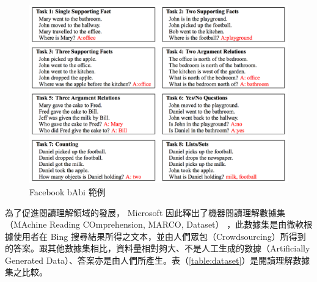 \begin{figure}[h]
    \includegraphics[scale=0.6]{images/chap2_babi.png}
    \caption{Facebook bAbi 範例}\label{fig:babi}
\end{figure}

為了促進閱讀理解領域的發展， Microsoft 因此釋出了機器閱讀理解數據集（MAchine Reading COmprehension, MARCO, Dataset）\cite{nguyen2016ms} ，此數據集是由微軟根據使用者在 Bing 搜尋結果所得之文本，並由人們眾包（Crowdsourcing）所得到的答案。跟其他數據集相比，資料量相對夠大、不是人工生成的數據（Artificially Generated Data）、答案亦是由人們所產生。表（\ref{table:dataset}）是閱讀理解數據集之比較。


